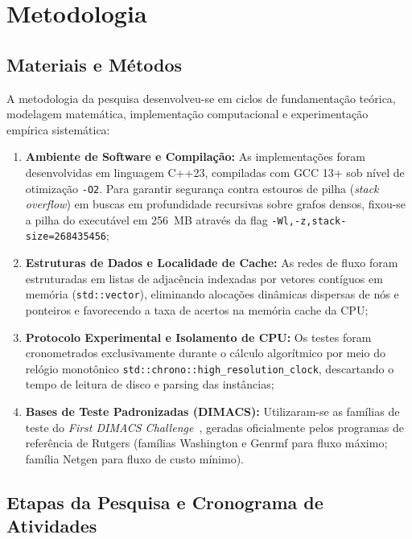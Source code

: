 \section{Metodologia}\label{sec:metodologia}

\subsection{Materiais e Métodos}

A metodologia da pesquisa desenvolveu-se em ciclos de fundamentação teórica, modelagem matemática, implementação computacional e experimentação empírica sistemática:

\begin{enumerate}[leftmargin=1.5em, itemsep=0.15em, topsep=0.2em, parsep=0em]
    \item \textbf{Ambiente de Software e Compilação:} As implementações foram desenvolvidas em linguagem C++23, compiladas com GCC 13+ sob nível de otimização \lstinline{-O2}. Para garantir segurança contra estouros de pilha (\textit{stack overflow}) em buscas em profundidade recursivas sobre grafos densos, fixou-se a pilha do executável em 256~MB através da flag \lstinline{-Wl,-z,stack-size=268435456};
    \item \textbf{Estruturas de Dados e Localidade de Cache:} As redes de fluxo foram estruturadas em listas de adjacência indexadas por vetores contíguos em memória (\lstinline{std::vector}), eliminando alocações dinâmicas dispersas de nós e ponteiros e favorecendo a taxa de acertos na memória cache da CPU;
    \item \textbf{Protocolo Experimental e Isolamento de CPU:} Os testes foram cronometrados exclusivamente durante o cálculo algorítmico por meio do relógio monotônico \lstinline{std::chrono::high_resolution_clock}, descartando o tempo de leitura de disco e parsing das instâncias;
    \item \textbf{Bases de Teste Padronizadas (DIMACS):} Utilizaram-se as famílias de teste do \textit{First DIMACS Challenge}~\cite{Jensen2022, ahuja1993network}, geradas oficialmente pelos programas de referência de Rutgers (famílias Washington e Genrmf para fluxo máximo; família Netgen para fluxo de custo mínimo).
\end{enumerate}

\subsection{Etapas da Pesquisa e Cronograma de Atividades}

